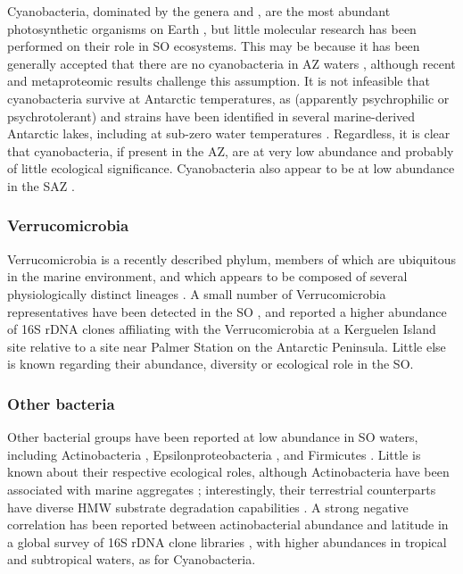 Cyanobacteria, dominated by the genera  and , are the most abundant photosynthetic organisms on Earth \citep[][and references therein]{Scanlan:2009cw}, but little molecular research has been performed on their role in \ac{SO} ecosystems.
This may be because it has been generally accepted that there are no cyanobacteria in \ac{AZ} waters \cite{Ghiglione:2011ee,Zubkov:1998uf,Evans:2011ih}, although recent and metaproteomic results \cite{Williams:2012bs} challenge this assumption.
It is not infeasible that cyanobacteria survive at Antarctic temperatures, as (apparently psychrophilic or psychrotolerant)  and  strains have been identified in several marine-derived Antarctic lakes, including at sub-zero water temperatures \cite{Bowman:2000ef,Powell:2005uh,Lauro:2010jna}.
Regardless, it is clear that cyanobacteria, if present in the \ac{AZ}, are at very low abundance \cite{Marchant:1987wv} and probably of little ecological significance.
Cyanobacteria also appear to be at low abundance in the \ac{SAZ} \cite{Abell:2005ji,Topping:2006ul}.  

\subsubsection{Verrucomicrobia}

Verrucomicrobia is a recently described phylum, members of which are ubiquitous in the marine environment, and which appears to be composed of several physiologically distinct lineages \cite{Freitas:2012jz}.
A small number of Verrucomicrobia representatives have been detected in the \ac{SO} \cite{Murray:2011ib,West:2008kc,Gentile:2006ef,Murray:2007db}, and \citet{Ghiglione:2011ee} reported a higher abundance of 16S rDNA clones affiliating with the Verrucomicrobia at a Kerguelen Island site relative to a site near Palmer Station on the Antarctic Peninsula.
Little else is known regarding their abundance, diversity or ecological role in the \ac{SO}.

\subsubsection{Other bacteria}

Other bacterial groups have been reported at low abundance in \ac{SO} waters, including Actinobacteria \cite{Bowman:2003fa,Brinkmeyer:2003iq,Abell:2005ji,Gentile:2006ef,Murray:2007db,Murray:2011ib,Ghiglione:2011ee,Piquet:2011fj,Jamieson:2012up}, Epsilonproteobacteria \cite{Gentile:2006ef,Murray:2007db}, and Firmicutes \cite{Murray:2007db,Anonymous:2011bw,Murray:2011ib}.
Little is known about their respective ecological roles, although Actinobacteria have been associated with marine aggregates \cite{Grossart:2006ez}; interestingly, their terrestrial counterparts have diverse \ac{HMW} substrate degradation capabilities \citep[reviewed in][]{Kirchman:2008wz}.
A strong negative correlation has been reported between actinobacterial abundance and latitude in a global survey of 16S rDNA clone libraries \cite{Pommier:2007vz}, with higher abundances in tropical and subtropical waters, as for Cyanobacteria.

